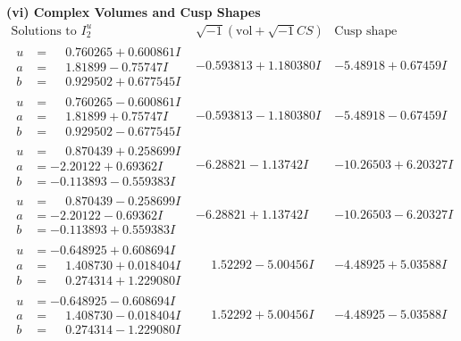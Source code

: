 \documentclass[1p]{elsarticle_modified}
\theoremstyle{definition}
\newcommand{\I}{\sqrt{-1}}
\begin{document}
\newpage\flushleft \textbf{(vi) Complex Volumes and Cusp Shapes}
$$\begin{array}{c|c|c}  
\text{Solutions to }I^u_{2}& \I (\text{vol} + \sqrt{-1}CS) & \text{Cusp shape}\\
 \hline 
\begin{aligned}
u &= \phantom{-}0.760265 + 0.600861 I \\
a &= \phantom{-}1.81899 - 0.75747 I \\
b &= \phantom{-}0.929502 + 0.677545 I\end{aligned}
 & -0.593813 + 1.180380 I & -5.48918 + 0.67459 I \\ \hline\begin{aligned}
u &= \phantom{-}0.760265 - 0.600861 I \\
a &= \phantom{-}1.81899 + 0.75747 I \\
b &= \phantom{-}0.929502 - 0.677545 I\end{aligned}
 & -0.593813 - 1.180380 I & -5.48918 - 0.67459 I \\ \hline\begin{aligned}
u &= \phantom{-}0.870439 + 0.258699 I \\
a &= -2.20122 + 0.69362 I \\
b &= -0.113893 - 0.559383 I\end{aligned}
 & -6.28821 - 1.13742 I & -10.26503 + 6.20327 I \\ \hline\begin{aligned}
u &= \phantom{-}0.870439 - 0.258699 I \\
a &= -2.20122 - 0.69362 I \\
b &= -0.113893 + 0.559383 I\end{aligned}
 & -6.28821 + 1.13742 I & -10.26503 - 6.20327 I \\ \hline\begin{aligned}
u &= -0.648925 + 0.608694 I \\
a &= \phantom{-}1.408730 + 0.018404 I \\
b &= \phantom{-}0.274314 + 1.229080 I\end{aligned}
 & \phantom{-}1.52292 - 5.00456 I & -4.48925 + 5.03588 I \\ \hline\begin{aligned}
u &= -0.648925 - 0.608694 I \\
a &= \phantom{-}1.408730 - 0.018404 I \\
b &= \phantom{-}0.274314 - 1.229080 I\end{aligned}
 & \phantom{-}1.52292 + 5.00456 I & -4.48925 - 5.03588 I \\ \hline\begin{aligned}

\end{aligned}
\end{array}$$
\end{document}
